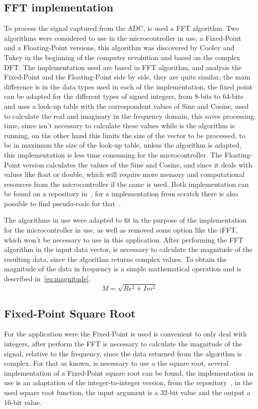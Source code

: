 \subsection{FFT implementation}
To process the signal captured from the ADC, is used a FFT algorithm. Two algorithms were considered to use in the microcontroller in use, a Fixed-Point and a Floating-Point versions, this algorithm was discovered by Cooley and Tukey in the beginning of the computer revolution and based on the complex DFT. The implementation used are based in FFT algorithm, and analysis the Fixed-Point and the Floating-Point side by side, they are quite similar, the main difference is in the data types used in each of the implementation, the fixed point can be adapted for the different types of signed integers, from 8-bits to 64-bits and uses a look-up table with the correspondent values of Sine and Cosine, used to calculate the real and imaginary in the frequency domain, this saves processing time, since isn't necessary to calculate these values while is the algorithm is running, on the other hand this limits the size of the vector to be processed, to be in maximum the size of the look-up table, unless the algorithm is adapted, this implementation is less time consuming for the microcontroller. The Floating-Point version calculates the values of the Sine and Cosine, and since it deals with values like float or double, which will require more memory and computational resources from the microcontroller if the same is used. Both implementation can be found on a repository in~\cite{262588213843476FixFft,Dannyf00FloatingPointFFTBenchmarka}, for a implementation from scratch there is also possible to find pseudo-code for that~\cite{smith1997scientist}.

The algorithms in use were adapted to fit in the purpose of the implementation for the microcontroller in use, as well as removed some option like the iFFT, which won't be necessary to use in this application.
After performing the FFT algorithm in the input data vector, is necessary to calculate the magnitude of the resulting data, since the algorithm returns complex values. To obtain the magnitude of the data in frequency is a simple mathematical operation and is described in~\ref{eq:magnitude}.
\begin{equation}\label{eq:magnitude}
    M = \sqrt{Re^2 + Im^2}
\end{equation}
\subsection{Fixed-Point Square Root}
For the application were the Fixed-Point is used is convenient to only deal with integers, after perform the FFT is necessary to calculate the magnitude of the signal, relative to the frequency, since the data returned from the algorithm is complex. For that as known, is necessary to use a the square root, several implementation of a Fixed-Point square root can be found, the implementation in use is an adaptation of the integer-to-integer version, from the repository~\cite{ChmikeFpsqrta}, in the used square root function, the input argument is a 32-bit value and the output a 16-bit value.

